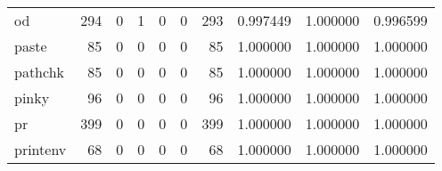 \begin{tabular}{lrrrrrrrrr}
od        &                                   294 &                                                  0 &                                                  1 &                                                  0 &                                                  0 &                                                293 &                                           0.997449 &                               1.000000 &                             0.996599 \\
paste     &                                    85 &                                                  0 &                                                  0 &                                                  0 &                                                  0 &                                                 85 &                                           1.000000 &                               1.000000 &                             1.000000 \\
pathchk   &                                    85 &                                                  0 &                                                  0 &                                                  0 &                                                  0 &                                                 85 &                                           1.000000 &                               1.000000 &                             1.000000 \\
pinky     &                                    96 &                                                  0 &                                                  0 &                                                  0 &                                                  0 &                                                 96 &                                           1.000000 &                               1.000000 &                             1.000000 \\
pr        &                                   399 &                                                  0 &                                                  0 &                                                  0 &                                                  0 &                                                399 &                                           1.000000 &                               1.000000 &                             1.000000 \\
printenv  &                                    68 &                                                  0 &                                                  0 &                                                  0 &                                                  0 &                                                 68 &                                           1.000000 &                               1.000000 &                             1.000000 \\

\end{tabular}
